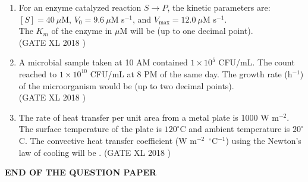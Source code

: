 \documentclass[14pt]{extarticle}
\begin{document}
\begin{flushleft}
\begin{enumerate}
\begin{enumerate}
\end{enumerate}

\item For an enzyme catalyzed reaction $S \rightarrow P$, the kinetic parameters are: \\
$[S] = 40\ \mu$M, $V_0 = 9.6\ \mu$M s$^{-1}$, and $V_{\max} = 12.0\ \mu$M s$^{-1}$. \\
The $K_m$ of the enzyme in $\mu$M will be \underline{\hspace{2cm}} (up to one decimal point).\\
\hfill(GATE XL 2018 )\\


\item A microbial sample taken at 10 AM contained $1\times 10^5$ CFU/mL. The count reached to $1\times 10^{10}$ CFU/mL at 8 PM of the same day. The growth rate (h$^{-1}$) of the microorganism would be \underline{\hspace{2cm}} (up to two decimal points).\\
\hfill(GATE XL 2018 )\\

\item The rate of heat transfer per unit area from a metal plate is 1000 W m$^{-2}$. The surface temperature of the plate is $120^\circ$C and ambient temperature is $20^\circ$C. The convective heat transfer coefficient (W m$^{-2}$~$^\circ$C$^{-1}$) using the Newton's law of cooling will be \underline{\hspace{2cm}}.
\hfill(GATE XL 2018 )\\

\end{enumerate}
\begin{center}
    \textbf{END OF THE QUESTION PAPER}
\end{center}

\end{flushleft}
\end{document}
